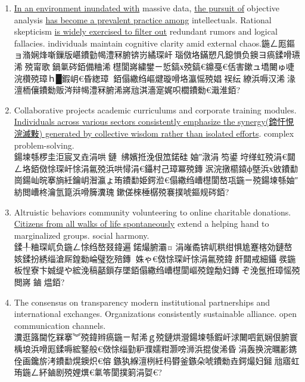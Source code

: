 ﻿\documentclass[lang=cn,11pt]{elegantbook}
\begin{document}
\begin{enumerate}
\item \underline{In an environment inundated with} massive data, \underline{the pursuit of} objective analysis \underline{has become a  prevalent practice among} intellectuals. Rational skepticism \underline{is widely exercised to filter out} redundant rumors and logical fallacies.  individuals maintain cognitive clarity amid external chaos.鍦ㄥ厖鏂ョ潃娴烽噺鏁版嵁鐨勭幆澧冧腑锛岃繘琛屽瑙傚垎鏋愬凡鎴愪负鐭ヨ瘑鍒嗗瓙浠殑甯歌鍋氭硶銆備粬浠櫘閬嶈繍鐢ㄧ悊鎬х殑鎬€鐤戞€佸害鏉ュ墧闄ゅ啑浣欑殑璋ｈ█鍜岄€昏緫璋銆傝繖绉嶇煡璇嗗垎瀛愮殑娼祦纭繚浜嗕汉浠湪澶栭儴鐨勬贩涔辩幆澧冧腑浠嶈兘淇濇寔娓呮櫚鐨勬€濈淮銆?
\item Collaborative projects  academic curriculums and corporate training modules. \underline{Individuals across various sectors consistently emphasize the synergy(鍗忓悓浣滅敤) generated by collective wisdom rather than isolated efforts}.  complex problem-solving.\\鍚堜綔椤圭洰宸叉垚涓哄鏈绋嬪拰浼佷笟鍩硅妯″潡涓笉鍙垨缂虹殑涓€閮ㄥ垎銆傚悇琛屽悇涓氱殑浜哄憳涓€鑷村己璋冪殑鏄泦浣撴櫤鎱ф墍浜х敓鐨勫崗鍚屾晥搴旓紝鑰岄潪瀛ょ珛鐨勫姫鍔涖€傝繖绉嶆櫘閬嶅瓨鍦ㄧ殑鍚堜綔妯″紡閲嶆柊瀹氫箟浜嗗簲瀵瑰鏉傞棶棰樼殑褰撲唬鏂规硶銆?
\item Altruistic behaviors  community volunteering to online charitable donations. \underline{Citizens from all walks of life spontaneously} extend a helping hand to marginalized groups.  social harmony.\\鍒╀粬琛屼负鍦ㄥ悇绉嶅叕鍏遍鍩熶腑灞¤涓嶉矞锛屼粠绀惧尯蹇楁効鏈嶅姟鍒扮綉缁滄厛鍠勬崘璧犵殕鏄姝ゃ€傚悇琛屽悇涓氱殑鍏皯閮戒細鑷彂鍦板悜寮卞娍缇や綋浼稿嚭鎻存墜銆傝繖绉嶆櫘閬嶇殑鍠勪妇鏄ぞ浼氬拰璋愮殑閲嶈鏀煴銆?
\item The consensus on transparency  modern institutional partnerships and international exchanges. Organizations consistently  sustainable alliance.  open communication channels.\\瀵逛簬閫忔槑搴︾殑鍏辫瘑鍦ㄧ幇浠ｇ殑鏈烘瀯鍚堜綔鍜屽浗闄呬氦娴佷腑寰楀埌浜嗗厖鍒嗕綋鐜般€傚悇缁勭粐濮嬬粓灏嗙浉浜掍俊浠昏涓轰换浣曞彲鎸佺画鑱旂洘鐨勫熀鐭炽€傛鏃犱緥澶栵紝杩欎釜鏃朵唬鐨勬垚鍔熶妇鎺兘寤虹珛鍦ㄥ紑鏀剧殑娌熼€氭笭閬撲箣涓娿€?

\end{enumerate}
\end{document}
